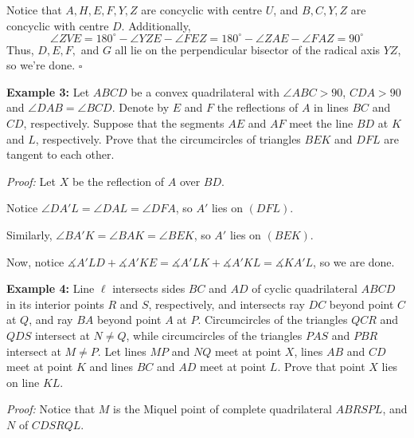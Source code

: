 \documentclass[10pt,letterpaper]{article}
\begin{document}
Notice that $A,H,E,F,Y,Z$ are concyclic with centre $U$, and $B,C,Y,Z$ are concyclic with centre $D$. Additionally, \[\angle ZVE=180^{\circ}-\angle YZE-\angle FEZ=180^{\circ}-\angle ZAE-\angle FAZ=90^{\circ}\]Thus, $D,E,F,$ and $G$ all lie on the perpendicular bisector of the radical axis $YZ$, so we're done. $\square$
\nopagebreak[4]\par{}
\par\vspace{12pt}
\begin{tcolorbox}[breakable,title={IMO Shortlist 2020 G3},colbacktitle=black!4,coltitle=black,fonttitle=\normalfont]
\textbf{Example 3:} Let $ABCD$ be a convex quadrilateral with $\angle ABC>90$, $CDA>90$ and $\angle DAB=\angle BCD$. Denote by $E$ and $F$ the reflections of $A$ in lines $BC$ and $CD$, respectively. Suppose that the segments $AE$ and $AF$ meet the line $BD$ at $K$ and $L$, respectively. Prove that the circumcircles of triangles $BEK$ and $DFL$ are tangent to each other.
\end{tcolorbox}
\textit{Proof:}
Let $X$ be the reflection of $A$ over $BD$.

Notice $\angle DA'L=\angle DAL=\angle DFA$, so $A'$ lies on $(DFL)$.

Similarly, $\angle BA'K=\angle BAK=\angle BEK$, so $A'$ lies on $(BEK)$.

Now, notice $\measuredangle A'LD+\measuredangle A'KE=\measuredangle A'LK+\measuredangle A'KL=\measuredangle KA'L$, so we are done.
\nopagebreak[4]\par{}
\par\vspace{12pt}
\begin{tcolorbox}[breakable,title={APMO 2024 P5},colbacktitle=black!4,coltitle=black,fonttitle=\normalfont]
\textbf{Example 4:} Line $\ell$ intersects sides $BC$ and $AD$ of cyclic quadrilateral $ABCD$ in its interior points $R$ and $S$, respectively, and intersects ray $DC$ beyond point $C$ at $Q$, and ray $BA$ beyond point $A$ at $P$. Circumcircles of the triangles $QCR$ and $QDS$ intersect at $N \neq Q$, while circumcircles of the triangles $PAS$ and $PBR$ intersect at $M\neq P$. Let lines $MP$ and $NQ$ meet at point $X$, lines $AB$ and $CD$ meet at point $K$ and lines $BC$ and $AD$ meet at point $L$. Prove that point $X$ lies on line $KL$.
\end{tcolorbox}
\textit{Proof:}
Notice that $M$ is the Miquel point of complete quadrilateral $ABRSPL$, and $N$ of $CDSRQL$.
\end{document}
